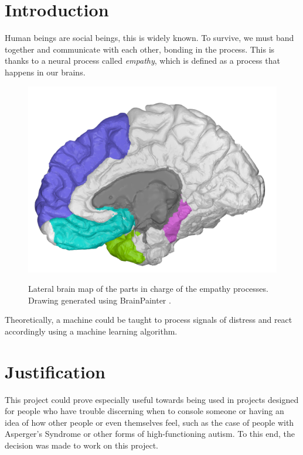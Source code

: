 \documentclass[a4]{sciposter}
\begin{document}
\begin{multicols}{3} 

\section{Introduction}
Human beings are social beings, this is widely known. To survive, we must band together and communicate with each other, bonding in the process. This is thanks to a neural process called \textit{empathy}, which is defined as a process that happens in our brains.
\begin{figure}[!h]
	\centering
	\includegraphics[scale=0.2]{BrainMap}
	\label{fig:brainmap}
	\captionsetup{type=figure}
	\setcounter{figure}{0}
	\caption{Lateral brain map of the parts in charge of the empathy processes. Drawing generated using BrainPainter \citep{img1}.}
\end{figure}

Theoretically, a machine could be taught to process signals of distress and react accordingly using a machine learning algorithm.

\section{Justification}
This project could prove especially useful towards being used in projects designed for people who have trouble discerning when to console someone or having an idea of how other people or even themselves feel, such as the case of people with Asperger's Syndrome or other forms of high-functioning autism.
To this end, the decision was made to work on this project.


\end{multicols}
\end{document}
